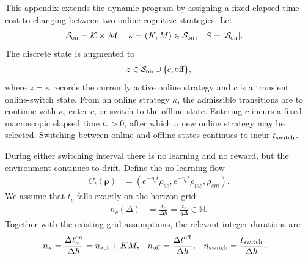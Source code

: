 \documentclass{article}
\begin{document}
This appendix extends the dynamic program by assigning a fixed elapsed-time cost to changing between two online cognitive strategies. Let
\begin{align}
\mathcal S_{\rm on} &= \mathcal K\times\mathcal M, & \kappa &= (K,M)\in\mathcal S_{\rm on}, & S &= |\mathcal S_{\rm on}|.
\end{align}
The discrete state is augmented to
\begin{align}
z\in\mathcal S_{\rm on}\cup\{c,{\rm off}\},
\end{align}
where $z=\kappa$ records the currently active online strategy and $c$ is a transient online-switch state. From an online strategy $\kappa$, the admissible transitions are to continue with $\kappa$, enter $c$, or switch to the offline state. Entering $c$ incurs a fixed macroscopic elapsed time $t_c>0$, after which a new online strategy may be selected. Switching between online and offline states continues to incur $t_{\rm switch}$.

During either switching interval there is no learning and no reward, but the environment continues to drift. Define the no-learning flow
\begin{align}
C_t(\boldsymbol\rho) &= \left(e^{-\eta_et}\rho_{se},e^{-\eta_et}\rho_{me},\rho_{sm}\right).
\end{align}
We assume that $t_c$ falls exactly on the horizon grid:
\begin{align}
n_c(\Delta) &= \frac{t_c}{\Delta h}=\frac{t_c}{q\Delta}\in\mathbb N.
\end{align}
Together with the existing grid assumptions, the relevant integer durations are
\begin{align}
n_\kappa &= \frac{\Delta t_\kappa^{\rm on}}{\Delta h}=n_{\rm act}+KM, & n_{\rm off} &= \frac{\Delta t^{\rm off}}{\Delta h}, & n_{\rm switch} &= \frac{t_{\rm switch}}{\Delta h}.
\end{align}
\end{document}
